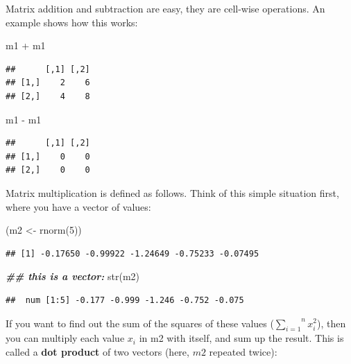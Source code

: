 \documentclass[
  12pt,
]{krantz}
\newenvironment{Shaded}{\begin{snugshade}}{\end{snugshade}}
\newcommand{\DecValTok}[1]{\textcolor[rgb]{0.00,0.00,0.81}{#1}}
\newcommand{\DocumentationTok}[1]{\textcolor[rgb]{0.56,0.35,0.01}{\textbf{\textit{#1}}}}
\newcommand{\FunctionTok}[1]{\textcolor[rgb]{0.00,0.00,0.00}{#1}}
\newcommand{\NormalTok}[1]{#1}
\newcommand{\OtherTok}[1]{\textcolor[rgb]{0.56,0.35,0.01}{#1}}
\newcommand{\SpecialCharTok}[1]{\textcolor[rgb]{0.00,0.00,0.00}{#1}}
\theoremstyle{definition}
\theoremstyle{definition}
\theoremstyle{definition}
\theoremstyle{definition}
\theoremstyle{remark}
\begin{document}
Matrix addition and subtraction are easy, they are cell-wise operations. An example shows how this works:

\begin{Shaded}
\begin{Highlighting}[]
\NormalTok{m1 }\SpecialCharTok{+}\NormalTok{ m1}
\end{Highlighting}
\end{Shaded}

\begin{verbatim}
##      [,1] [,2]
## [1,]    2    6
## [2,]    4    8
\end{verbatim}

\begin{Shaded}
\begin{Highlighting}[]
\NormalTok{m1 }\SpecialCharTok{{-}}\NormalTok{ m1}
\end{Highlighting}
\end{Shaded}

\begin{verbatim}
##      [,1] [,2]
## [1,]    0    0
## [2,]    0    0
\end{verbatim}

Matrix multiplication is defined as follows. Think of this simple situation first, where you have a vector of values:

\begin{Shaded}
\begin{Highlighting}[]
\NormalTok{(m2 }\OtherTok{\textless{}{-}} \FunctionTok{rnorm}\NormalTok{(}\DecValTok{5}\NormalTok{))}
\end{Highlighting}
\end{Shaded}

\begin{verbatim}
## [1] -0.17650 -0.99922 -1.24649 -0.75233 -0.07495
\end{verbatim}

\begin{Shaded}
\begin{Highlighting}[]
\DocumentationTok{\#\# this is a vector:}
\FunctionTok{str}\NormalTok{(m2)}
\end{Highlighting}
\end{Shaded}

\begin{verbatim}
##  num [1:5] -0.177 -0.999 -1.246 -0.752 -0.075
\end{verbatim}

If you want to find out the sum of the squares of these values (\(\overset{n}{\underset{i=1}\sum} x_i ^2\)), then you can multiply each value \(x_i\) in m2 with itself, and sum up the result. This is called a \textbf{dot product} of two vectors (here, \(m2\) repeated twice):
\end{document}
